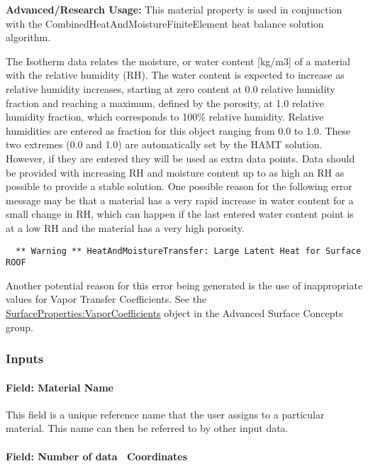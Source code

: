 \textbf{Advanced/Research Usage:} This material property is used in conjunction with the CombinedHeatAndMoistureFiniteElement heat balance solution algorithm.

The Isotherm data relates the moisture, or water content {[}kg/m3{]} of a material with the relative humidity (RH). The water content is expected to increase as relative humidity increases, starting at zero content at 0.0 relative humidity fraction and reaching a maximum, defined by the porosity, at 1.0 relative humidity fraction, which corresponds to 100\% relative humidity. Relative humidities are entered as fraction for this object ranging from 0.0 to 1.0. These two extremes (0.0 and 1.0) are automatically set by the HAMT solution. However, if they are entered they will be used as extra data points. Data should be provided with increasing RH and moisture content up to as high an RH as possible to provide a stable solution. One possible reason for the following error message may be that a material has a very rapid increase in water content for a small change in RH, which can happen if the last entered water content point is at a low RH and the material has a very high porosity.

\begin{lstlisting}
  ** Warning ** HeatAndMoistureTransfer: Large Latent Heat for Surface ROOF
\end{lstlisting}

Another potential reason for this error being generated is the use of inappropriate values for Vapor Transfer Coefficients. See the \hyperref[surfacepropertiesvaporcoefficients]{SurfaceProperties:VaporCoefficients} object in the Advanced Surface Concepts group.

\subsubsection{Inputs}\label{inputs-8-024}

\paragraph{Field: Material Name}\label{field-material-name-1}

This field is a unique reference name that the user assigns to a particular material. This name can then be referred to by other input data.

\paragraph{Field: Number of data ~Coordinates}\label{field-number-of-data-coordinates}

